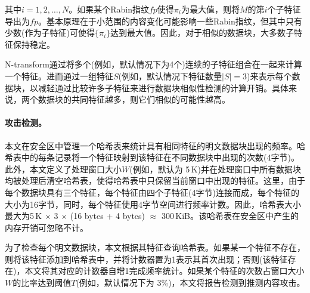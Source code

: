 其中$i = 1, 2,\ldots, N$。如果某个Rabin指纹$fp$使得$\pi_i$为最大值，则将$M$的第$i$个子特征导出为$fp$。基本原理在于小范围的内容变化可能影响一些Rabin指纹，但其中只有少数(作为子特征)可使得$\{\pi_i\}$达到最大值。因此，对于相似的数据块，大多数子特征保持稳定。

N-transform通过将多个(例如，默认情况下为4个)连续的子特征组合在一起来计算一个特征。进而通过一组特征$S$(例如，默认情况下特征数量$|S| = 3$)来表示每个数据块，以减轻通过比较许多子特征来进行数据块相似性检测的计算开销。具体来说，两个数据块的共同特征越多，则它们相似的可能性越高。

\paragraph*{攻击检测。}

本文在安全区中管理一个哈希表来统计具有相同特征的明文数据块出现的频率。哈希表中的每条记录将一个特征映射到该特征在不同数据块中出现的次数(4字节)。此外，本文定义了处理窗口大小$W$(例如，默认为 5\,K)并在处理窗口中所有数据块均被处理后清空哈希表，使得哈希表中只保留当前窗口中出现的特征。这里，由于每个数据块具有三个特征，每个特征由四个子特征(4字节)连接而成，每个特征的大小为16字节，同时，每个特征使用4字节空间进行频率计数。因此，哈希表大小最大为5\,K $\times$ 3 $\times$ (16 bytes + 4 bytes) $\approx$ 300\,KiB。该哈希表在安全区中产生的内存开销可忽略不计。

为了检查每个明文数据块，本文根据其特征查询哈希表。如果某一个特征不存在，则将该特征添加到哈希表中，并将计数器置为1表示其首次出现；否则(该特征存在)，本文将其对应的计数器自增1完成频率统计。如果某个特征的次数占窗口大小$W$的比率达到阈值$T$(例如，默认情况下为 3\%)，本文将报告检测到推测内容攻击。
